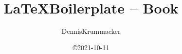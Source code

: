 %
\newcommand{\TPtitle}{%
\LaTeX Boilerplate -- Book%
}%
\newcommand{\TPsubtitle}{%
i.e. big Documents with lots of pages. Additional structuring level "Chapter" available.
}%
\newcommand{\TPtitleGer}{%
\TPtitle%
}%
\newcommand{\TPsubtitleGer}{%
d.h für große Dokumente mit vielen Seiten. Zusätzlich ist das Strukturierungs-Level "Kapitel" verfügbar.
}%
\newcommand{\TPpublicationType}{Template}%
\newcommand{\TPpublicationTypeGer}{Template}%
\newcommand{\TPauthorAnrede}{}%
\newcommand{\TPauthorTitleBefore}{}%
\newcommand{\TPauthorTitleAfter}{M.Sc.}%
\newcommand{\TPauthorFirst}{Dennis}%
\newcommand{\TPauthorLast}{Krummacker}%
\newcommand{\TPauthorStreet}{Albert-Schweitzer-Str. 57}%
\newcommand{\TPauthorPLZ}{67655}%
\newcommand{\TPauthorCity}{Kaiserslautern}%
\newcommand{\TPauthorMail}{dennis.krummacker@gmail.com}%
\newcommand{\TPsignedAtCity}{Kaiserslautern}%
\newcommand{\TPsupervisorOneAnrede}{}%
\newcommand{\TPsupervisorOneTitleBefore}{Prof. Dr.-Ing.}%
\newcommand{\TPsupervisorOneTitleAfter}{}%
\newcommand{\TPsupervisorOneFirst}{Hans D.}%
\newcommand{\TPsupervisorOneLast}{Schotten}%
\newcommand{\TPsupervisorTwoAnrede}{}%
\newcommand{\TPsupervisorTwoTitleBefore}{Prof. Dr.}%
\newcommand{\TPsupervisorTwoTitleAfter}{}%
\newcommand{\TPsupervisorTwoFirst}{FName}%
\newcommand{\TPsupervisorTwoLast}{LName}%
\newcommand{\TPsupervisorThreeAnrede}{}%
\newcommand{\TPsupervisorThreeTitleBefore}{}%
\newcommand{\TPsupervisorThreeTitleAfter}{}%
\newcommand{\TPsupervisorThreeFirst}{}%
\newcommand{\TPsupervisorThreeLast}{}%
\newcommand{\TPdeanAnrede}{}%
\newcommand{\TPdeanTitleBefore}{Prof. Dr. rer. nat.}%
\newcommand{\TPdeanTitleAfter}{}%
\newcommand{\TPdeanFirst}{Marco}%
\newcommand{\TPdeanLast}{Rahm}%
\newcommand{\TPauditchairAnrede}{}%
\newcommand{\TPauditchairTitleBefore}{Prof. Dr.-Ing.}%
\newcommand{\TPauditchairTitleAfter}{}%
\newcommand{\TPauditchairFirst}{Norbert}%
\newcommand{\TPauditchairLast}{Wehn}%
\newcommand{\TPoralExamdate}{2022-01-01}%
\newcommand{\TPdate}{2021-10-11}%
%
%
%
%
%
%
%
\title{\TPtitle}%
\author{\TPauthorFirst \TPauthorLast}%
\date{\copyright \TPdate}%